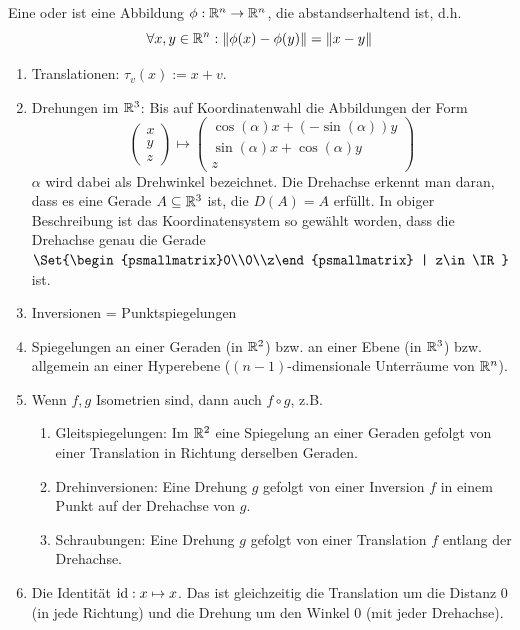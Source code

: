 \begin{definition}
Eine  oder  ist eine Abbildung $\phi:\mathbb{R}^n\to\mathbb{R}^n$, die abstandserhaltend ist, d.h.
\[\forall x,y\in\mathbb{R}^n: \lVert\phi(x)-\phi(y)\rVert = \lVert x-y\rVert\]
\end{definition}

\begin{example}
\begin{enumerate}
\item Translationen: $\tau_v(x) := x+v$.
\item Drehungen im $\mathbb{R}^3$: Bis auf Koordinatenwahl die Abbildungen der Form
\[\begin{pmatrix}x\\y\\z\end{pmatrix}\mapsto\begin{pmatrix}
\cos(\alpha)x + (-\sin(\alpha)) y \\
\sin(\alpha)x + \cos(\alpha)y \\
z
\end{pmatrix}\]
$\alpha$ wird dabei als Drehwinkel bezeichnet. Die Drehachse erkennt man daran, dass es eine Gerade $A\subseteq\mathbb{R}^3$ ist, die $D(A)=A$ erfüllt. In obiger Beschreibung ist das Koordinatensystem so gewählt worden, dass die Drehachse genau die Gerade $\Set{\begin{psmallmatrix}0\\0\\z\end{psmallmatrix} | z\in\IR}$ ist.
\item Inversionen = Punktspiegelungen
\item Spiegelungen an einer Geraden (in $\mathbb{R}^2$) bzw. an einer Ebene (in $\mathbb{R}^3$) bzw. allgemein an einer Hyperebene ($(n-1)$-dimensionale Unterräume von $\mathbb{R}^n$).
\item Wenn $f,g$ Isometrien sind, dann auch $f\circ g$, z.B.
\begin{enumerate}
\item Gleitspiegelungen: Im $\mathbb{R}^2$ eine Spiegelung an einer Geraden gefolgt von einer Translation in Richtung derselben Geraden.
\item Drehinversionen: Eine Drehung $g$ gefolgt von einer Inversion $f$ in einem Punkt auf der Drehachse von $g$.
\item Schraubungen: Eine Drehung $g$ gefolgt von einer Translation $f$ entlang der Drehachse.
\end{enumerate}
\item Die Identität $\operatorname{id}: x\mapsto x$. Das ist gleichzeitig die Translation um die Distanz $0$ (in jede Richtung) und die Drehung um den Winkel $0$ (mit jeder Drehachse).
\end{enumerate}
\end{example}

